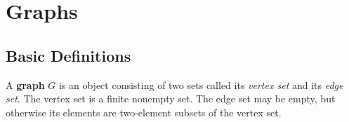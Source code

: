 \section{Graphs}
\subsection*{Basic Definitions}

\begin{definition}
    A \textbf{graph} $G$ is an object consisting of two sets called its \textit{vertex set} and its \textit{edge set}. The vertex set is a finite nonempty set. The edge set may be empty, but otherwise its elements are two-element subsets of the vertex set. 
\end{definition}


